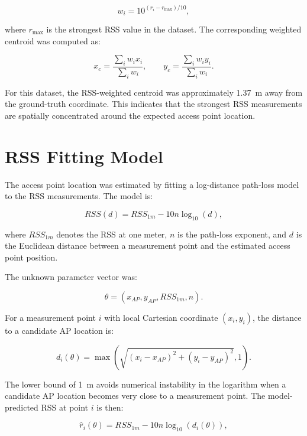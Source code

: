 \documentclass[11pt,a4paper]{article}
\begin{document}
\begin{equation}
w_i = 10^{(r_i-r_{\max})/10},
\end{equation}

where \(r_{\max}\) is the strongest RSS value in the dataset. The corresponding
weighted centroid was computed as:

\begin{equation}
x_c = \frac{\sum_i w_i x_i}{\sum_i w_i},
\qquad
y_c = \frac{\sum_i w_i y_i}{\sum_i w_i}.
\end{equation}

For this dataset, the RSS-weighted centroid was approximately
\SI{1.37}{m} away from the ground-truth coordinate. This indicates that
the strongest RSS measurements are spatially concentrated around the expected
access point location.

\section{RSS Fitting Model}

The access point location was estimated by fitting a log-distance path-loss
model to the RSS measurements. The model is:

\begin{equation}
RSS(d) = RSS_{1m} - 10n\log_{10}(d),
\end{equation}

where \(RSS_{1m}\) denotes the RSS at one meter, \(n\) is the path-loss exponent,
and \(d\) is the Euclidean distance between a measurement point and the estimated
access point position.

The unknown parameter vector was:

\begin{equation}
\theta = (x_{AP}, y_{AP}, RSS_{1m}, n).
\end{equation}

For a measurement point \(i\) with local Cartesian coordinate \((x_i,y_i)\),
the distance to a candidate AP location is:

\begin{equation}
d_i(\theta)=\max\left(\sqrt{(x_i-x_{AP})^2+(y_i-y_{AP})^2}, 1\right).
\end{equation}

The lower bound of \SI{1}{m} avoids numerical instability in the logarithm
when a candidate AP location becomes very close to a measurement point. The
model-predicted RSS at point \(i\) is then:

\begin{equation}
\widehat{r}_i(\theta)=RSS_{1m}-10n\log_{10}\left(d_i(\theta)\right),
\end{equation}
\end{document}

